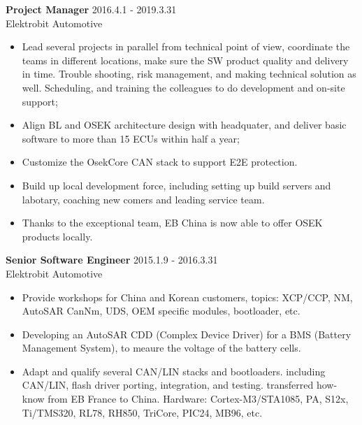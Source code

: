 \textbf{Project Manager} \hfill 2016.4.1 - 2019.3.31 \\
        Elektrobit Automotive
        \begin{itemize}  \itemsep -2pt %
        \item Lead several projects in parallel from technical point of view,
            coordinate the teams in different locations,
            make sure the SW product quality and delivery in time.
            Trouble shooting, risk management, and making technical solution as well.
            Scheduling, and training the colleagues to do development and on-site support;
        \item Align BL and OSEK architecture design with headquater,
              and deliver basic software to more than 15 ECUs within half a year;
        \item Customize the OsekCore CAN stack to support E2E protection.
        \item Build up local development force,
        including setting up build servers and labotary,
        coaching new comers
        and leading service team.
        \item Thanks to the exceptional team,
            EB China is now able to offer OSEK products locally.
        \end{itemize}

\textbf{Senior Software Engineer} \hfill 2015.1.9 - 2016.3.31 \\
        Elektrobit Automotive
        \begin{itemize}  \itemsep -2pt %
        \item Provide workshops for China and Korean customers,
            topics:
            XCP/CCP, NM, AutoSAR CanNm, UDS, OEM specific modules, bootloader, etc.
        \item Developing an AutoSAR CDD (Complex Device Driver) for a BMS (Battery Management System),
            to meaure the voltage of the battery cells.
        \item Adapt and qualify several CAN/LIN stacks and bootloaders.
            including CAN/LIN, flash driver porting, integration, and testing.
            transferred how-know from EB France to China.
            Hardware: Cortex-M3/STA1085, PA, S12x, Ti/TMS320, RL78, RH850, TriCore, PIC24, MB96, etc.
        \end{itemize}


